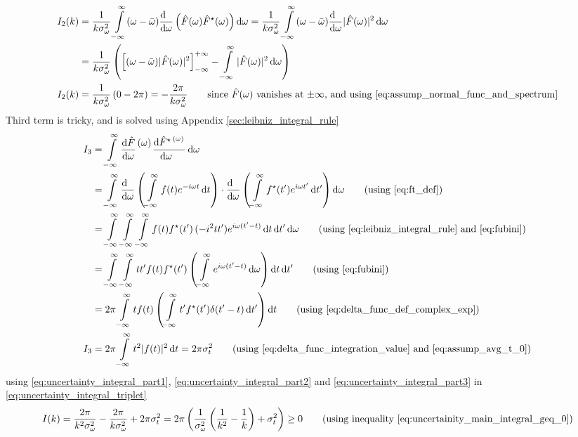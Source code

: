 \documentclass[11pt, a4paper]{article}
\newcommand{\numerator}[1]{\genfrac{}{}{0pt}{}{#1}{}}
\newcommand{\eqrefnp}[1]{\textup{\ref{#1}}}
\newcommand{\primed}[1]{#1^{\prime}}
\newcommand{\tp}{\primed{t}}	%
\newcommand{\variance}[1]{\sigma_{#1}^{2}}
\newcommand{\diff}{\mathop{}\!\mathrm{d}}
\newcommand{\dt}{\diff t}
\newcommand{\dtp}{\diff \tp}
\newcommand{\domega}{\diff \omega}
\newcommand{\derv}[1]{\frac{\diff \hfill}{\diff #1}}	%
\newcommand{\dervb}[2]{\derv{#1} \left(#2\right)}  %
\newcommand{\dervf}[2]{\frac{\diff #2}{\diff #1 \hfil}}	%
\newcommand{\dint}[2]{\int \limits_{#1}^{#2}}  %
\newcommand{\intinfty}{\dint{-\infty}{\infty}}	%
\newcommand{\iintinfty}{\intinfty \intinfty}	%
\newcommand{\iiintinfty}{\intinfty \intinfty \intinfty}	%
\begin{document}
\begin{align}
	I_{2}(k) & = \frac{1}{k \variance{\omega}} \intinfty (\omega - \bar{\omega}) \dervb{\omega}{\hat{F}(\omega) \hat{F}^{\star}(\omega)} \domega = \frac{1}{k \variance{\omega}} \intinfty (\omega - \bar{\omega}) \derv{\omega}|\hat{F}(\omega)|^{2} \domega \nonumber \\
	& = \frac{1}{k \variance{\omega}} \left(\left[(\omega - \bar{\omega})|\hat{F}(\omega)|^{2}\right]_{-\infty}^{+\infty} - \intinfty |\hat{F}(\omega)|^{2} \domega \right) \nonumber \\
	I_{2}(k) & = \frac{1}{k \variance{\omega}} \left(0 - 2\pi \right) = -\frac{2\pi}{k \variance{\omega}} \qquad \text{since $\hat{F}(\omega)$ vanishes at $\pm\infty$, and using \eqref{eq:assump_normal_func_and_spectrum}} \label{eq:uncertainty_integral_part2}
\end{align}
Third term is tricky, and is solved using Appendix \ref{sec:leibniz_integral_rule}
\begin{align}
	I_{3} & = \intinfty \dervf{\omega}{\hat{F}}\numerator{(\omega)} \dervf{\omega}{\hat{F}^{\star}\numerator{(\omega)}} \domega \nonumber \\
	& = \intinfty \dervb{\omega}{\intinfty f(t)e^{-i \omega t} \dt} \cdot \dervb{\omega}{\intinfty f^{\star}(\tp)e^{i \omega \tp} \dtp} \domega \nonumber \tag{using \eqrefnp{eq:ft_def}} \\
	& =  \iiintinfty f(t)f^{\star}(\tp)\,(-i^{2}t \tp)e^{i \omega (\tp - t)} \dt \dtp \domega
	\nonumber \tag{using \eqrefnp{eq:leibniz_integral_rule} and \eqrefnp{eq:fubini}} \\
	& = \iintinfty t \tp f(t)f^{\star}(\tp) \left(\intinfty e^{i \omega (\tp - t)} \domega \right) \dt \dtp \nonumber \tag{using \eqrefnp{eq:fubini}} \\
	& = 2 \pi \intinfty t f(t) \left(\intinfty \tp f^{\star}(\tp) \delta(\tp - t) \dtp \right) \dt  \nonumber \tag{using \eqrefnp{eq:delta_func_def_complex_exp}} \\
	I_{3} & = 2 \pi \intinfty t^{2} |f(t)|^{2} \dt = 2 \pi \variance{t}  \qquad \text{(using \eqrefnp{eq:delta_func_integration_value} and \eqrefnp{eq:assump_avg_t_0})} \label{eq:uncertainty_integral_part3}
\end{align}
using \eqref{eq:uncertainty_integral_part1}, \eqref{eq:uncertainty_integral_part2} and \eqref{eq:uncertainty_integral_part3} in \eqref{eq:uncertainty_integral_triplet}
\begin{equation*}
	I(k) = \frac{2 \pi}{k^{2} \variance{\omega}} - \frac{2 \pi}{k \variance{\omega}} + 2 \pi \variance{t} = 2 \pi \left(\frac{1}{\variance{\omega}}\left( \frac{1}{k^{2}} - \frac{1}{k}\right) + \variance{t} \right) \geq 0 \tag{using inequality \eqrefnp{eq:uncertainity_main_integral_geq_0}}
\end{equation*}
\end{document}
